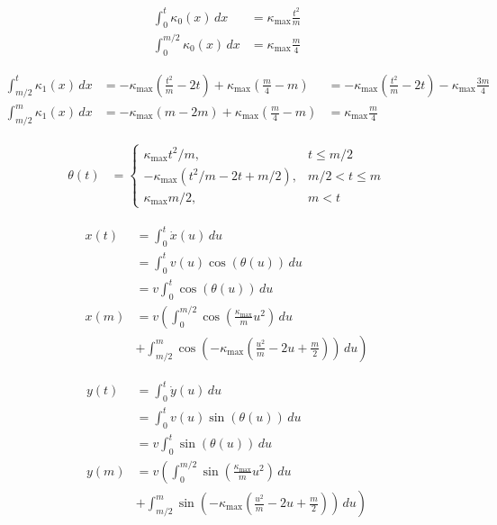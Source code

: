 \documentclass{article}
\begin{document}
\begin{align}
  \int_{0}^{t} \kappa_{0}\left(x\right)\,dx &= \kappa_{\max}\frac{t^{2}}{m}\\
  \int_{0}^{m/2} \kappa_{0}\left(x\right)\,dx &= \kappa_{\max}\frac{m}{4}
\end{align}

\begin{align}
  \int_{m/2}^{t} \kappa_{1}\left(x\right)\,dx &= -\kappa_{\max}\left(\frac{t^{2}}{m}-2t\right) + \kappa_{\max}\left(\frac{m}{4}-m\right) &= -\kappa_{\max}\left(\frac{t^{2}}{m}-2t\right) - \kappa_{\max}\frac{3m}{4}\\
  \int_{m/2}^{m} \kappa_{1}\left(x\right)\,dx &= -\kappa_{\max}\left(m-2m\right) + \kappa_{\max}\left(\frac{m}{4}-m\right) &= \kappa_{\max}\frac{m}{4}
\end{align}

\begin{align}
  \theta\left(t\right) &= \left\{
    \begin{array}{cc}
      \kappa_{\max} t^2 / m,   & t \le m/2\\
      -\kappa_{\max}\left(t^{2}/m-2t + m/2\right),& m/2 < t \le m\\
      \kappa_{\max}m/2, & m < t
    \end{array}
  \right.
\end{align}

\begin{align}
  x\left(t\right) &= \int_{0}^{t} \dot{x}\left(u\right)\,du\\
  &= \int_{0}^{t} v\left(u\right)\cos\left(\theta\left(u\right)\right)\,du\\
  &= v \int_{0}^{t} \cos\left(\theta\left(u\right)\right)\,du\\
  x\left(m\right) &= v \left(\int_{0}^{m/2} \cos\left(\frac{\kappa_{\max}}{m} u^2\right)\,du\right.\\
  &+ \left.\int_{m/2}^{m} \cos\left(-\kappa_{\max}\left(\frac{u^{2}}{m}-2u + \frac{m}{2}\right)\right)\,du\right)
\end{align}

\begin{align}
  y\left(t\right) &= \int_{0}^{t} \dot{y}\left(u\right)\,du\\
  &= \int_{0}^{t} v\left(u\right)\sin\left(\theta\left(u\right)\right)\,du\\
  &= v \int_{0}^{t} \sin\left(\theta\left(u\right)\right)\,du\\
  y\left(m\right) &= v \left(\int_{0}^{m/2} \sin\left(\frac{\kappa_{\max}}{m} u^2\right)\,du\right.\\
  &+ \left.\int_{m/2}^{m} \sin\left(-\kappa_{\max}\left(\frac{u^{2}}{m}-2u + \frac{m}{2}\right)\right)\,du\right)
\end{align}
\end{document}
